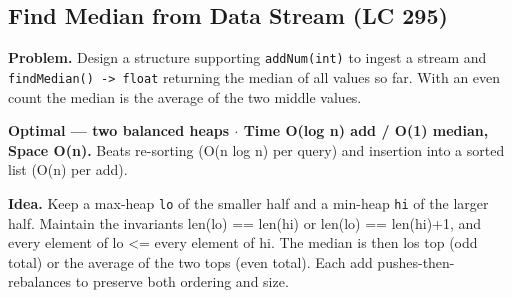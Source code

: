 \documentclass[11pt]{article}
\begin{document}
\subsection{Find Median from Data Stream (LC 295)}\label{find-median-from-data-stream-lc-295}

\textbf{Problem.} Design a structure supporting \texttt{addNum(int)} to ingest a stream and \texttt{findMedian()\ -\textgreater{}\ float} returning the median of all values so far. With an even count the median is the average of the two middle values.

\textbf{Optimal --- two balanced heaps \(\cdot\) Time O(log n) add / O(1) median, Space O(n).} Beats re-sorting (O(n log n) per query) and insertion into a sorted list (O(n) per add).

\textbf{Idea.} Keep a max-heap \texttt{lo} of the smaller half and a min-heap \texttt{hi} of the larger half. Maintain the invariants len(lo) == len(hi) or len(lo) == len(hi)+1, and every element of lo \textless= every element of hi. The median is then lo\textquotesingle s top (odd total) or the average of the two tops (even total). Each add pushes-then-rebalances to preserve both ordering and size.

\end{document}
